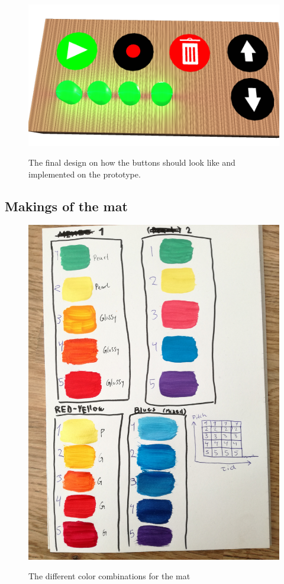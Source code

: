 \begin{figure}[H]
	\centering
	\includegraphics[width=0.7\linewidth]{figure/Design/buttonDesign}
	\label{fig:buttonDesign}
	\caption{The final design on how the buttons should look like and implemented on the prototype.}
	
\end{figure}


\subsection{Makings of the mat}

\begin{figure}[H]
	\centering
	\includegraphics[width=0.7\linewidth]{figure/Design/colors}
	\label{fig:colors}
	\caption{The different color combinations for the mat}
	
\end{figure}

